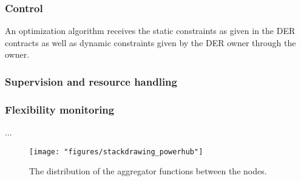 \subsubsection{Control}
An optimization algorithm receives the static constraints as given in the DER contracts as well as dynamic constraints given by the DER owner through the owner. 

\subsubsection{Supervision and resource handling}

\subsubsection{Flexibility monitoring}
...
\begin{figure}[htb]
\centering
\texttt{[image: "figures/stackdrawing\_powerhub"]}
\caption{The distribution of the aggregator functions between the nodes.}
\label{fig:powerhub}
\end{figure}